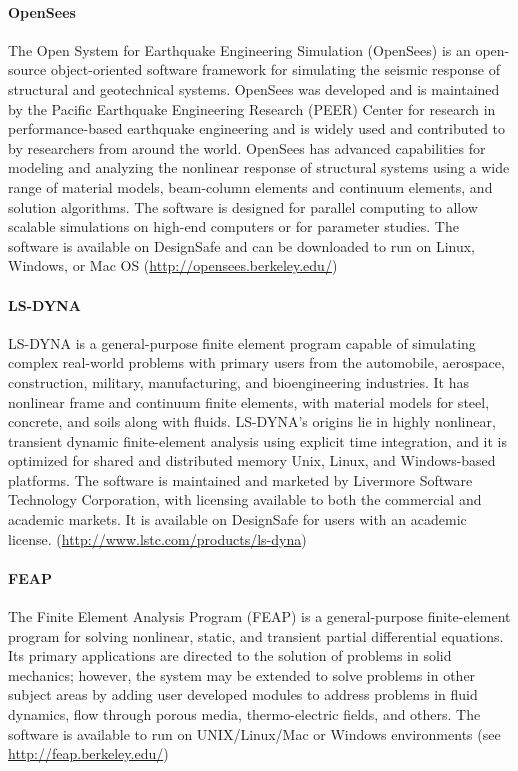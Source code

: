 \paragraph{OpenSees} The Open System for Earthquake Engineering Simulation (OpenSees) is an open-source object-oriented software framework for simulating the seismic response of structural and geotechnical systems. OpenSees was developed and is maintained by the Pacific Earthquake Engineering Research (PEER) Center for research in performance-based earthquake engineering and is widely used and contributed to by researchers from around the world. OpenSees has advanced capabilities for modeling and analyzing the nonlinear response of structural systems using a wide range of material models, beam-column elements and continuum elements, and solution algorithms. The software is designed for parallel computing to allow scalable simulations on high-end computers or for parameter studies. The software is available on DesignSafe and can be downloaded to run on Linux, Windows, or Mac OS (\url{http://opensees.berkeley.edu/})

\paragraph{LS-DYNA} LS-DYNA is a general-purpose finite element program capable of simulating complex real-world problems with primary users from the automobile, aerospace, construction, military, manufacturing, and bioengineering industries. It has nonlinear frame and continuum finite elements, with material models for steel, concrete, and soils along with fluids. LS-DYNA's origins lie in highly nonlinear, transient dynamic finite-element analysis using explicit time integration, and it is optimized for shared and distributed memory Unix, Linux, and Windows-based platforms. The software is maintained and marketed by Livermore Software Technology Corporation, with licensing available to both the commercial and academic markets. It is available on DesignSafe for users with an academic license. (\url{http://www.lstc.com/products/ls-dyna}) 

\paragraph{FEAP} The Finite Element Analysis Program (FEAP) is a general-purpose finite-element program for solving nonlinear, static, and transient partial differential equations. Its primary applications are directed to the solution of problems in solid mechanics; however, the system may be extended to solve problems in other subject areas by adding user developed modules to address problems in fluid dynamics, flow through porous media, thermo-electric fields, and others. The software is available to run on UNIX/Linux/Mac or Windows environments (see \url{http://feap.berkeley.edu/})


